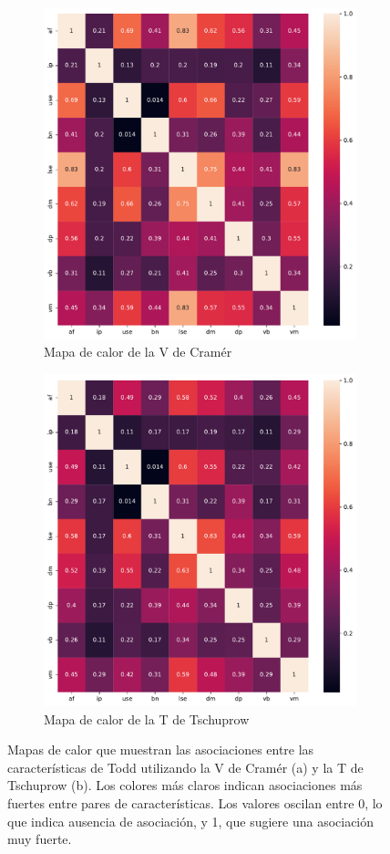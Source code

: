 \begin{figure}[p]
    \centering
    \begin{subfigure}{\textwidth}
        \centering
        \includegraphics[width=0.6\linewidth]{../../scripts/eda/assoc_plot_cramersv.pdf}
        \caption{Mapa de calor de la V de Cramér}
        \label{fig4:todd_chars__cramersv}
    \end{subfigure}
    \begin{subfigure}{\textwidth}
        \centering
        \includegraphics[width=0.6\linewidth]{../../scripts/eda/assoc_plot_tschuprow.pdf}
        \caption{Mapa de calor de la T de Tschuprow}
        \label{fig4:todd_chars__tschuprow}
    \end{subfigure}
    \caption[Mapas de calor de asociaciones entre características de Todd]{Mapas de calor que muestran las asociaciones entre las características de Todd utilizando la V de Cramér (a) y la T de Tschuprow (b). Los colores más claros indican asociaciones más fuertes entre pares de características. Los valores oscilan entre 0, lo que indica ausencia de asociación, y 1, que sugiere una asociación muy fuerte.}
    \label{fig4:todd_chars_correlogram}
\end{figure}

